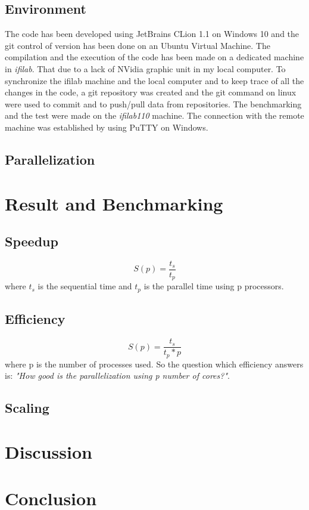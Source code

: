 \documentclass[11pt,conference]{IEEEtran}
\begin{document}


\subsection{Environment}
The code has been developed using JetBrains CLion 1.1 on Windows 10 and the git control of version has been done on an Ubuntu Virtual Machine. The compilation and the execution of the code has been made on a dedicated machine in \textit{ifilab}. That due to a lack of NVidia graphic unit in my local computer.
\newline
To synchronize the ifilab machine and the local computer and to keep trace of all the changes in the code, a git repository was created and the git command on linux were used to commit and to push/pull data from repositories.
\newline
The benchmarking and the test were made on the \textit{ifilab110} machine. The connection with the remote machine was established by using PuTTY on Windows.


\subsection{Parallelization}

\section{Result and Benchmarking}


\subsection{Speedup}
\[ S(p) = \dfrac{t_s}{t_p}  \]
where $t_s$ is the sequential time and $t_p$ is the parallel time using p processors. 

 
\subsection{Efficiency}
\[ S(p) = \dfrac{t_s}{t_p * p}  \]
where p is the number of processes used. So the question which efficiency answers is: \textit{"How good is the parallelization using p number of cores?"}. 

\subsection{Scaling}

\section{Discussion}

\section{Conclusion}



\end{document}
